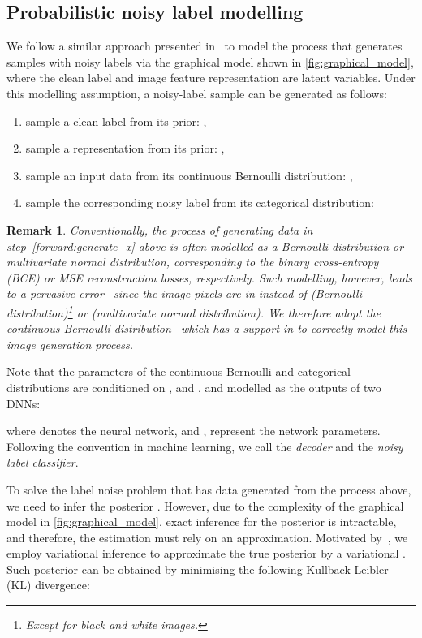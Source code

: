 \documentclass[10pt,twocolumn,letterpaper]{article}
\newtheorem{remark}{Remark}
\begin{document}
    \subsection{Probabilistic noisy label modelling}
    \label{sec:probabilistic_modelling}
        We follow a similar approach presented in~\cite{yao2021instance} to model the process that generates samples with noisy labels via the graphical model shown in \cref{fig:graphical_model}, where the clean label  and image feature representation  are latent variables. Under this modelling assumption, a noisy-label sample  can be generated as follows:
        \begin{enumerate}
            \item sample a clean label from its prior: ,
            \item sample a representation from its prior: ,
            \item sample an input data from its continuous Bernoulli distribution: , \label{forward:generate_x}
            \item sample the corresponding noisy label from its categorical distribution: 
\end{enumerate}

        \begin{remark}\label{remark}
            Conventionally, the process of generating data  in step~\ref{forward:generate_x} above is often modelled as a Bernoulli distribution or multivariate normal distribution, corresponding to the binary cross-entropy (BCE) or MSE reconstruction losses, respectively. Such modelling, however, leads to a pervasive error~\cite{loaiza2019continuous} since the image pixels are in  instead of  (Bernoulli distribution)\footnote{Except for black and white images.} or  (multivariate normal distribution). We therefore adopt the continuous Bernoulli distribution~\cite{loaiza2019continuous} which has a support in  to correctly model this image generation process.
        \end{remark}
        
        Note that the parameters of the continuous Bernoulli and categorical distributions are conditioned on ,  and , and modelled as the outputs of two DNNs:
        
where  denotes the neural network,
        and , represent the network parameters. Following the convention in machine learning, we call  the \emph{decoder} and  the \emph{noisy label classifier}.

        To solve the label noise problem that has data generated from the process above, we need to infer the posterior . However, due to the complexity of the graphical model in \cref{fig:graphical_model}, exact inference for the posterior  is intractable, and therefore, the estimation must rely on an approximation. Motivated by~\cite{yao2021instance}, we employ variational inference to approximate the true posterior  by a variational  . Such posterior can be obtained by minimising the following Kullback-Leibler (KL) divergence:
        
\end{document}
